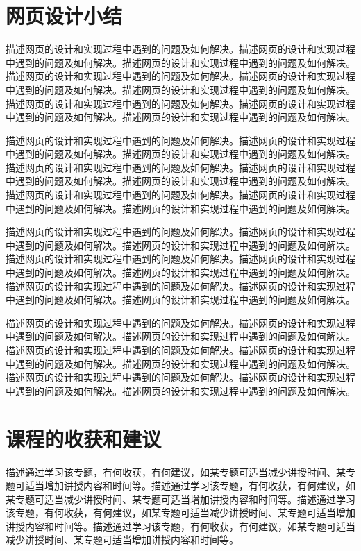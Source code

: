 \documentclass[supercite]{Experimental_Report}
\theoremstyle{definition}
\begin{document}
\newpage

\section{网页设计小结}

描述网页的设计和实现过程中遇到的问题及如何解决。描述网页的设计和实现过程中遇到的问题及如何解决。描述网页的设计和实现过程中遇到的问题及如何解决。描述网页的设计和实现过程中遇到的问题及如何解决。描述网页的设计和实现过程中遇到的问题及如何解决。描述网页的设计和实现过程中遇到的问题及如何解决。描述网页的设计和实现过程中遇到的问题及如何解决。描述网页的设计和实现过程中遇到的问题及如何解决。描述网页的设计和实现过程中遇到的问题及如何解决。

描述网页的设计和实现过程中遇到的问题及如何解决。描述网页的设计和实现过程中遇到的问题及如何解决。描述网页的设计和实现过程中遇到的问题及如何解决。描述网页的设计和实现过程中遇到的问题及如何解决。描述网页的设计和实现过程中遇到的问题及如何解决。描述网页的设计和实现过程中遇到的问题及如何解决。描述网页的设计和实现过程中遇到的问题及如何解决。描述网页的设计和实现过程中遇到的问题及如何解决。描述网页的设计和实现过程中遇到的问题及如何解决。

描述网页的设计和实现过程中遇到的问题及如何解决。描述网页的设计和实现过程中遇到的问题及如何解决。描述网页的设计和实现过程中遇到的问题及如何解决。描述网页的设计和实现过程中遇到的问题及如何解决。描述网页的设计和实现过程中遇到的问题及如何解决。描述网页的设计和实现过程中遇到的问题及如何解决。描述网页的设计和实现过程中遇到的问题及如何解决。描述网页的设计和实现过程中遇到的问题及如何解决。描述网页的设计和实现过程中遇到的问题及如何解决。

描述网页的设计和实现过程中遇到的问题及如何解决。描述网页的设计和实现过程中遇到的问题及如何解决。描述网页的设计和实现过程中遇到的问题及如何解决。描述网页的设计和实现过程中遇到的问题及如何解决。描述网页的设计和实现过程中遇到的问题及如何解决。描述网页的设计和实现过程中遇到的问题及如何解决。描述网页的设计和实现过程中遇到的问题及如何解决。描述网页的设计和实现过程中遇到的问题及如何解决。描述网页的设计和实现过程中遇到的问题及如何解决。

\newpage

\section{课程的收获和建议}

描述通过学习该专题，有何收获，有何建议，如某专题可适当减少讲授时间、某专题可适当增加讲授内容和时间等。描述通过学习该专题，有何收获，有何建议，如某专题可适当减少讲授时间、某专题可适当增加讲授内容和时间等。描述通过学习该专题，有何收获，有何建议，如某专题可适当减少讲授时间、某专题可适当增加讲授内容和时间等。描述通过学习该专题，有何收获，有何建议，如某专题可适当减少讲授时间、某专题可适当增加讲授内容和时间等。
\end{document}
